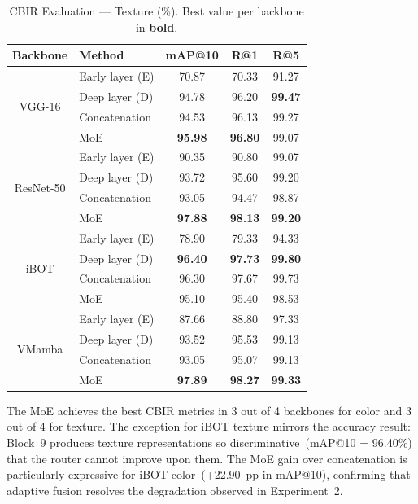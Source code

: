 \documentclass[letterpaper, 10 pt, conference]{ieeeconf}
\begin{document}
\begin{table}[htbp]
\caption{CBIR Evaluation --- Texture (\%). Best value per backbone in
         \textbf{bold}.}
\begin{center}
\begin{tabular}{c|l|c|c|c}
\hline
\textbf{Backbone} & \textbf{Method} & \textbf{mAP@10}
                  & \textbf{R@1} & \textbf{R@5} \\
\hline
\multirow{4}{*}{VGG-16}
  & Early layer (E)         & 70.87 & 70.33 & 91.27 \\
  & Deep layer (D)          & 94.78 & 96.20 & \textbf{99.47} \\
  & Concatenation           & 94.53 & 96.13 & 99.27 \\
  & MoE & \textbf{95.98} & \textbf{96.80} & 99.07 \\
\hline
\multirow{4}{*}{ResNet-50}
  & Early layer (E)         & 90.35 & 90.80 & 99.07 \\
  & Deep layer (D)          & 93.72 & 95.60 & 99.20 \\
  & Concatenation           & 93.05 & 94.47 & 98.87 \\
  & MoE & \textbf{97.88} & \textbf{98.13} & \textbf{99.20} \\
\hline
\multirow{4}{*}{iBOT}
  & Early layer (E)         & 78.90 & 79.33 & 94.33 \\
  & Deep layer (D)          & \textbf{96.40} & \textbf{97.73} & \textbf{99.80} \\
  & Concatenation           & 96.30 & 97.67 & 99.73 \\
  & MoE & 95.10 & 95.40 & 98.53 \\
\hline
\multirow{4}{*}{VMamba}
  & Early layer (E)         & 87.66 & 88.80 & 97.33 \\
  & Deep layer (D)          & 93.52 & 95.53 & 99.13 \\
  & Concatenation           & 93.05 & 95.07 & 99.13 \\
  & MoE & \textbf{97.89} & \textbf{98.27} & \textbf{99.33} \\
\hline
\end{tabular}
\label{tab_cbir_texture}
\end{center}
\end{table}

The MoE achieves the best CBIR metrics in 3 out of 4 backbones for color
and 3 out of 4 for texture.
The exception for iBOT texture mirrors the accuracy result: Block~9
produces texture representations so discriminative~(mAP@10 = 96.40\%)
that the router cannot improve upon them.
The MoE gain over concatenation is particularly expressive for iBOT
color~(+22.90~pp in mAP@10), confirming that adaptive fusion resolves
the degradation observed in Experiment~2.
\end{document}
